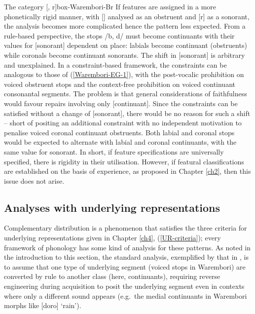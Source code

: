 \begin{dadpbox}{The category {[\B, r]}}{box-Warembori-Br}
If features are assigned in a more phonetically rigid manner, with [] analysed as an obstruent and [r] as a sonorant, the analysis becomes more complicated hence the pattern less expected. From a rule-based perspective, the stops /b, d/ must become continuants with their values for [sonorant] dependent on place: labials become continuant (obstruents) while coronals become continuant sonorants. The shift in [sonorant] is arbitrary and unexplained. In a constraint-based framework, the constraints can be analogous to those of (\ref{Warembori-EG-1}), with the post-vocalic prohibition on voiced obstruent stops and the context-free prohibition on voiced continuant consonantal segments. The problem is that general considerations of faithfulness would favour repairs involving only [continuant]. Since the constraints can be satisfied without a change of [sonorant], there would be no reason for such a shift -- short of positing an additional constraint with no independent motivation to penalise voiced coronal continuant obstruents. Both labial and coronal stops would be expected to alternate with labial and coronal continuants, with the same value for sonorant. In short, if feature specifications are universally specified, there is rigidity in their utilisation. However, if featural classifications are established on the basis of experience, as proposed in Chapter \ref{ch2}, then this issue does not arise.
\end{dadpbox}



\subsection{Analyses with underlying representations}



Complementary distribution is a phenomenon that satisfies the three criteria for underlying representations  given in Chapter \ref{ch4}, (\ref{UR-criteria}); every framework of phonology has some kind of analysis for these patterns. As noted in the introduction to this section, the standard analysis, exemplified by that in \citet{Donohue:1999}, is to assume that one type of underlying segment (voiced stops in Warembori) are converted by rule to another class (here, continuants), requiring reverse engineering during acquisition to posit the underlying segment even in contexts where only a different sound appears (e.g.\ the medial continuants in Warembori morphs like [doro] `rain'). 



